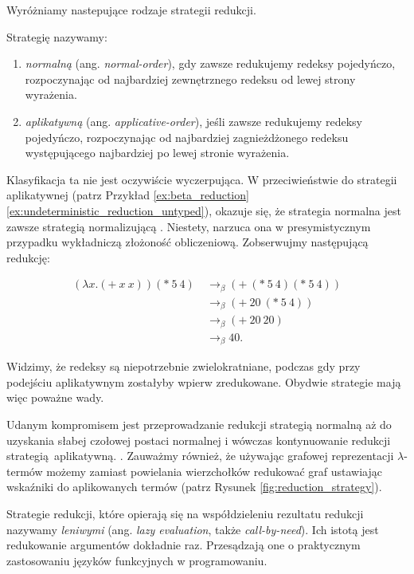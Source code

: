 Wyróżniamy nastepujące rodzaje strategii redukcji.

\begin{definicja}
Strategię nazywamy:
\begin{enumerate}
\item \emph{normalną} (ang. \emph{normal-order}), gdy zawsze redukujemy redeksy pojedyńczo, rozpoczynając od najbardziej zewnętrznego redeksu od lewej strony wyrażenia.
\item \emph{aplikatywną} (ang. \emph{applicative-order}), jeśli zawsze redukujemy redeksy pojedyńczo, rozpoczynając od najbardziej zagnieżdżonego redeksu występującego najbardziej po lewej stronie wyrażenia.
\end{enumerate}
\end{definicja}

Klasyfikacja ta nie jest oczywiście wyczerpująca. W przeciwieństwie do strategii aplikatywnej (patrz Przykład \ref{ex:beta_reduction}\ref{ex:undeterministic_reduction_untyped}), okazuje się, że strategia normalna jest zawsze strategią normalizującą \cite[Rozdział 1.5]{Urzyczyn2006}. Niestety, narzuca ona w presymistycznym przypadku wykładniczą złożoność obliczeniową. Zobserwujmy następującą redukcję:

\begin{align*}
  \left(\lambda x.(+\ x\ x)\right)(*\ 5\ 4)\ &\to_\beta (+\ (*\ 5\ 4)(*\ 5\ 4))\tag{\(\blacktriangledown\)}\label{ex:normal_reduction}\\
  &\to_\beta (+\ 20\ (*\ 5\ 4))\\
  &\to_\beta (+\ 20\ 20)\\
  &\to_\beta 40.
\end{align*}

Widzimy, że redeksy są niepotrzebnie zwielokratniane, podczas gdy przy podejściu aplikatywnym zostałyby wpierw zredukowane. Obydwie strategie mają więc poważne wady.

Udanym kompromisem jest przeprowadzanie redukcji strategią normalną aż do uzyskania słabej czołowej postaci normalnej i wówczas kontynuowanie redukcji strategią aplikatywną. \cite[Rozdział 11.3]{PeytonJones:1987:IFP:1096899}. Zauważmy również, że używając grafowej reprezentacji \(\lambda\)-termów możemy zamiast powielania wierzchołków redukować graf ustawiając wskaźniki do aplikowanych termów (patrz Rysunek \ref{fig:reduction_strategy}). 

Strategie redukcji, które opierają się na współdzieleniu rezultatu redukcji nazywamy \emph{leniwymi} (ang. \emph{lazy evaluation}, także \emph{call-by-need}). Ich istotą jest redukowanie argumentów dokładnie raz. Przesądzają one o praktycznym zastosowaniu języków funkcyjnych w programowaniu.
